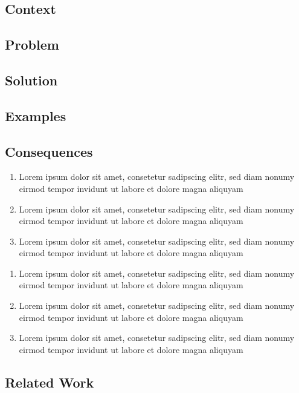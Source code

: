 
\subsection*{Context}
	
    
\subsection*{Problem}


\subsection*{Solution}



\subsection*{Examples}
 
\subsection*{Consequences}

\renewcommand{\labelenumi}{$+$}
\begin{enumerate}
\item Lorem ipsum dolor sit amet, consetetur sadipscing elitr, sed diam nonumy eirmod tempor invidunt ut labore et dolore magna aliquyam
\item Lorem ipsum dolor sit amet, consetetur sadipscing elitr, sed diam nonumy eirmod tempor invidunt ut labore et dolore magna aliquyam
\item Lorem ipsum dolor sit amet, consetetur sadipscing elitr, sed diam nonumy eirmod tempor invidunt ut labore et dolore magna aliquyam
\end{enumerate}

\renewcommand{\labelenumi}{$-$}
\begin{enumerate}
\item Lorem ipsum dolor sit amet, consetetur sadipscing elitr, sed diam nonumy eirmod tempor invidunt ut labore et dolore magna aliquyam
\item Lorem ipsum dolor sit amet, consetetur sadipscing elitr, sed diam nonumy eirmod tempor invidunt ut labore et dolore magna aliquyam
\item Lorem ipsum dolor sit amet, consetetur sadipscing elitr, sed diam nonumy eirmod tempor invidunt ut labore et dolore magna aliquyam
\end{enumerate}
 
\subsection*{Related Work}
	
    